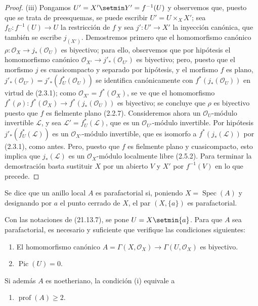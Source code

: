 \begin{proof}
(iii) Pongamos $U'=X'\setmin Y'=f^{-1}(U)$ y observemos que, puesto que se trata de preesquemas, se
puede escribir $U'=U\times_X X'$; sea $f_U:f^{-1}(U)\to U$ la restricción de $f$ y
sea $j':U'\to X'$ la inyección canónica, que también se escribe $j_{(X')}$. Demostremos
primero que el homomorfismo canónico
$\rho:\mathcal O_X\to j_*(\mathcal O_U)$ es biyectivo; para ello, observemos que por
hipótesis el homomorfismo canónico
$\mathcal O_{X'}\to j'_*(\mathcal O_{U'})$ es biyectivo; pero, puesto que el morfismo
$j$ es cuasicompacto y separado por hipótesis, y el morfismo $f$ es plano,
$j'_*(\mathcal O_{U'})=j'_*(f_U^*(\mathcal O_U))$ se identifica canónicamente con
$f^*(j_*(\mathcal O_U))$ en virtud de (2.3.1); como
$\mathcal O_{X'}=f^*(\mathcal O_X)$, se ve que el homomorfismo
$f^*(\rho):f^*(\mathcal O_X)\to f^*(j_*(\mathcal O_U))$ es biyectivo; se concluye
que $\rho$ es biyectivo puesto que $f$ es fielmente plano (2.2.7). Consideremos ahora
un $\mathcal O_U$-módulo invertible $\mathscr L$, y sea
$\mathscr L'=f_U^*(\mathscr L)$, que es un $\mathcal O_{U'}$-módulo invertible. Por
hipótesis $j'_*(f_U^*(\mathscr L))$ es un $\mathcal O_{X'}$-módulo invertible, que
es isomorfo a $f^*(j_*(\mathscr L))$ por (2.3.1), como antes. Pero, puesto que $f$
es fielmente plano y cuasicompacto, esto implica que $j_*(\mathscr L)$ es un
$\mathcal O_X$-módulo localmente libre (2.5.2). Para terminar la demostración basta
sustituir $X$ por un abierto $V$ y $X'$ por $f^{-1}(V)$ en lo que
precede.
\end{proof}

\begin{definition}[21.13.7]
\label{IV.21.13.7}
Se dice que un anillo local $A$ es parafactorial si, poniendo
$X=\operatorname{Spec}(A)$ y designando por $a$ el punto cerrado de $X$, el par
$(X,\{a\})$ es parafactorial.
\end{definition}

\begin{proposition}[21.13.8]
\label{IV.21.13.8}
Con las notaciones de \textup{(21.13.7)}, se pone $U=X\setmin\{a\}$. Para que $A$ sea
parafactorial, es necesario y suficiente que verifique las condiciones siguientes:
\begin{enumerate}[label=\textup{(\roman*)}]
  \item El homomorfismo canónico
  $A=\Gamma(X,\mathcal O_X)\to\Gamma(U,\mathcal O_X)$ es biyectivo.
  \item $\operatorname{Pic}(U)=0$.
\end{enumerate}
Si además $A$ es noetheriano, la condición \textup{(i)} equivale a
\begin{enumerate}
  \item[\textup{(i \emph{bis})}] $\operatorname{prof}(A)\geq2$.
\end{enumerate}
\end{proposition}

